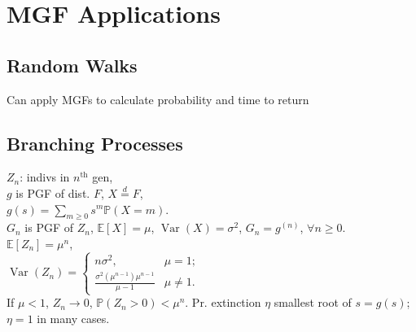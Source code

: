 \section{MGF Applications}
	\subsection*{Random Walks}
	Can apply MGFs to calculate probability and time to return

	\subsection*{Branching Processes}
	$Z_{n}$: indivs in $n^{\text{th}}$ gen,\\
	$g$ is PGF of dist. $F$, $X\stackrel{d}{=}F$,\\
	$g\left(s\right) = \sum_{m\geq 0}s^{m}\mathbb{P}\left(X = m\right)$.\\
	$G_{n}$ is PGF of $Z_{n}$, $\mathbb{E}\left[X\right] = \mu$, $\operatorname{Var}\left(X\right) = \sigma^{2}$, $G_{n} = g^{\left(n\right)}$, $\forall n\geq 0$.\\
	$\mathbb{E}\left[Z_{n}\right] = \mu^{n}$,\\
	$\operatorname{Var}\left(Z_{n}\right) =
		\begin{cases}
			n\sigma^{2}, & \mu = 1;\\
			\frac{\sigma^{2}\left(\mu^{n - 1}\right)\mu^{n - 1}}{\mu - 1} & \mu\neq 1.
		\end{cases}$\\
	If $\mu < 1$, $Z_{n}\to 0$, $\mathbb{P}\left(Z_{n} > 0\right) < \mu^{n}$.
	Pr. extinction $\eta$ smallest root of $s = g\left(s\right)$; $\eta = 1$ in many cases.
